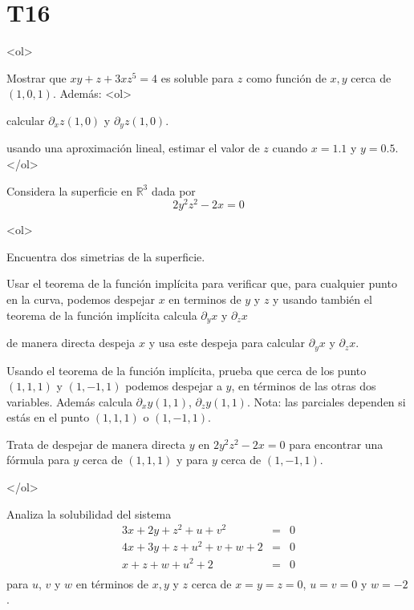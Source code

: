\documentclass{article}
\theoremstyle{definition}
\begin{document}
  \section*{T16 }

  
  
	<ol>

        \item Mostrar que $xy+z+3xz^5=4$ es soluble para $z$ como
          función de $x,y$ cerca de $(1,0,1)$. Además:
          <ol>
          \item calcular $\partial_xz(1,0)$ y $\partial_yz(1,0)$.
          \item usando una aproximación lineal, estimar el valor de $z$
            cuando $x=1.1$ y $y=0.5$.
          </ol>
          
        \item Considera la superficie en $\mathbb{R}^3$ dada por
          $$
          2y^2z^2-2x=0
          $$

          <ol>

          \item Encuentra dos simetrias de la superficie.
            
          \item Usar el teorema de la función implícita para verificar
            que, para cualquier punto en la curva,
            podemos despejar $x$ en terminos de $y$ y $z$ y usando
            también el teorema de la función implícita
            calcula $\partial_y x$ y $\partial_z x$
          \item de manera directa despeja $x$ y usa este despeja para calcular
            $\partial_y x$ y $\partial_z x$.

            

          \item Usando el teorema de la función
            implícita, prueba que cerca de los punto $(1,1,1)$ y $(1,-1,1)$ podemos
            despejar a  $y$, en términos de las otras dos variables. Además
            calcula $\partial_xy(1,1)$, $\partial_z y (1,1)$. Nota:
            las parciales dependen si estás en el punto $(1,1,1)$ o $(1,-1,1)$.

          \item Trata de despejar de manera directa $y$ en $2y^2z^2-2x=0$
            para encontrar una fórmula para $y$ cerca de $(1,1,1)$
            y para $y$ cerca de $(1,-1,1)$.
            

          </ol>


        \item Analiza la solubilidad del sistema
          \begin{eqnarray*}
            3x+2y+z^2+u+v^2&=&0\\
            4x+3y+z+u^2+v+w+2&=&0\\
            x+z+w+u^2+2&=&0\\
          \end{eqnarray*}
          para $u$, $v$ y $w$ en términos de $x,y$ y $z$ cerca de $x=y=z=0$,
          $u=v=0$ y $w=-2$.
\end{document}
